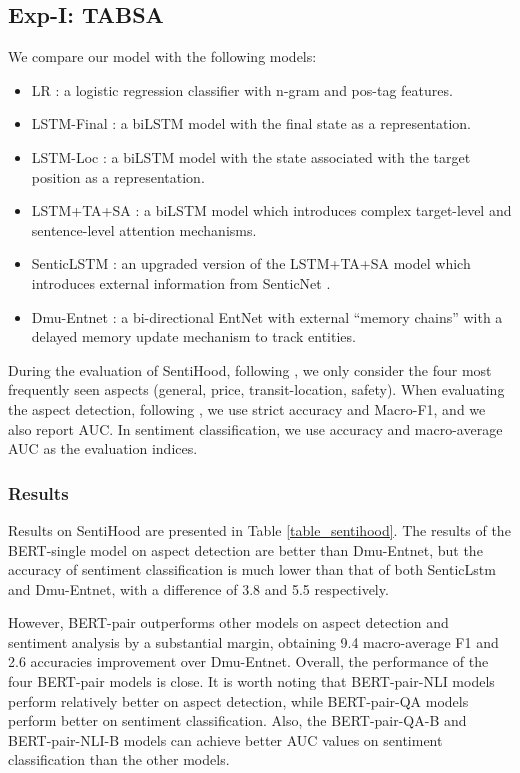\documentclass[11pt,a4paper]{article}
\theoremstyle{definition}
\begin{document}
	\subsection{Exp-I: TABSA}
	We compare our model with the following models:
	\begin{itemize}
		\item
		LR \cite{saeidi2016sentihood}: a logistic regression classifier with n-gram and pos-tag features.
		\item
		LSTM-Final \cite{saeidi2016sentihood}: a biLSTM model with the final state as a representation.
		\item
		LSTM-Loc \cite{saeidi2016sentihood}: a biLSTM model with the state associated with the target position as a representation.
		\item
		LSTM+TA+SA \cite{ma2018targeted}: a biLSTM model which introduces complex target-level and sentence-level attention mechanisms.
		\item
		SenticLSTM \cite{ma2018targeted}: an upgraded version of the LSTM+TA+SA model which introduces external information from SenticNet \cite{cambria2016senticnet}.
		\item
		Dmu-Entnet \cite{liu2018recurrent}: a bi-directional EntNet \cite{henaff2016tracking} with external “memory chains” with a delayed memory update mechanism to track entities.
		
	\end{itemize}
	During the evaluation of SentiHood, following \citet{saeidi2016sentihood}, we only consider the four most frequently seen aspects (general, price, transit-location, safety). When evaluating the aspect detection, following \citet{ma2018targeted}, we use strict accuracy and Macro-F1, and we also report AUC.  In sentiment classification, we use accuracy and macro-average AUC as the evaluation indices.
	
	\subsubsection{Results}
	Results on SentiHood are presented in Table \ref{table_sentihood}. The results of the BERT-single model on aspect detection are better than Dmu-Entnet, but the accuracy of sentiment classification is much lower than that of both SenticLstm and Dmu-Entnet, with a difference of 3.8 and 5.5 respectively.
	
	However, BERT-pair outperforms other models on aspect detection and sentiment analysis by a substantial margin, obtaining 9.4 macro-average F1 and 2.6 accuracies improvement over Dmu-Entnet. Overall, the performance of the four BERT-pair models is close. It is worth noting that BERT-pair-NLI models perform relatively better on aspect detection, while BERT-pair-QA models perform better on sentiment classification. Also, the BERT-pair-QA-B and BERT-pair-NLI-B models can achieve better AUC values on sentiment classification than the other models.
	
\end{document}
